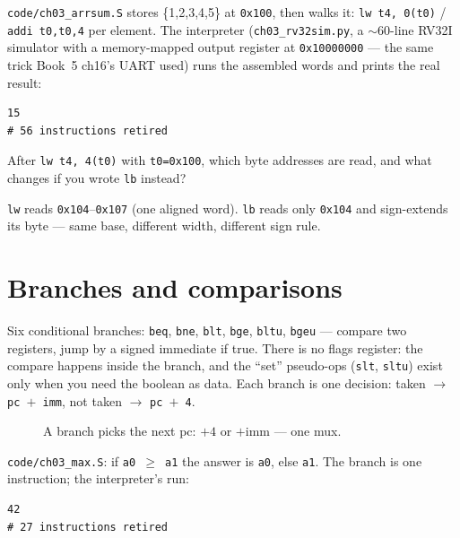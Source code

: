 \begin{example}
\label{ex:arrsum03}
\texttt{code/ch03\_arrsum.S} stores \{1,2,3,4,5\} at \texttt{0x100},
then walks it: \texttt{lw t4, 0(t0)} / \texttt{addi t0,t0,4} per
element. The interpreter (\texttt{ch03\_rv32sim.py}, a $\sim$60-line
RV32I simulator with a memory-mapped output register at
\texttt{0x10000000} --- the same trick Book~5 ch16's UART used) runs
the assembled words and prints the real result:

\begin{lstlisting}[basicstyle=\ttfamily\scriptsize]
15
# 56 instructions retired
\end{lstlisting}
\end{example}

\begin{checkpoint}
After \texttt{lw t4, 4(t0)} with \texttt{t0=0x100}, which byte
addresses are read, and what changes if you wrote \texttt{lb} instead?
\end{checkpoint}
\begin{solution}
\texttt{lw} reads \texttt{0x104}--\texttt{0x107} (one aligned word).
\texttt{lb} reads only \texttt{0x104} and sign-extends its byte ---
same base, different width, different sign rule.
\end{solution}

\section{Branches and comparisons}
\label{sec:branch03}

Six conditional branches: \texttt{beq}, \texttt{bne}, \texttt{blt},
\texttt{bge}, \texttt{bltu}, \texttt{bgeu} --- compare two registers,
jump by a signed immediate if true. There is no flags register: the
compare happens inside the branch, and the ``set'' pseudo-ops
(\texttt{slt}, \texttt{sltu}) exist only when you need the boolean as
data. Each branch is one decision: taken $\to$ \texttt{pc $+$ imm},
not taken $\to$ \texttt{pc $+$ 4}.

\begin{figure}[htbp]
\centering

\caption{A branch picks the next pc: $+4$ or $+$imm --- one mux.}
\label{fig:pcnext03}
\end{figure}

\begin{example}
\label{ex:max03}
\texttt{code/ch03\_max.S}: if \texttt{a0 $\geq$ a1} the answer is
\texttt{a0}, else \texttt{a1}. The branch is one instruction; the
interpreter's run:

\begin{lstlisting}[basicstyle=\ttfamily\scriptsize]
42
# 27 instructions retired
\end{lstlisting}
\end{example}

